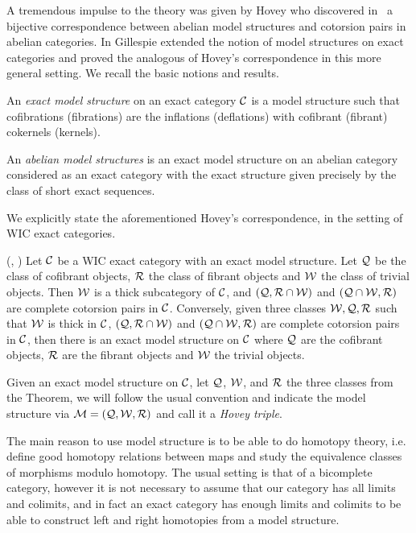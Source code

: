 A tremendous impulse to the theory was given by  Hovey who discovered in~\cite{Hov07} a bijective correspondence between abelian model structures and cotorsion pairs in abelian categories.
%
In \cite{G5} Gillespie extended the notion of model structures on exact categories and proved the analogous of Hovey's correspondence in this more general setting.
 We recall the basic notions and results.
 \begin{defn}\label{D:exact-model} An \emph{exact model structure} on an exact category $\mathcal{C}$ is a model structure such that cofibrations (fibrations) are the inflations (deflations) with cofibrant (fibrant) cokernels (kernels).

   An \emph{abelian model structures} is an exact model structure on an abelian category considered as an exact category with the exact structure given precisely by the class of short exact sequences.
\end{defn}
%

We explicitly state the aforementioned Hovey's correspondence, in the setting of WIC exact categories.

\begin{thm}\label{T:correspondence} (\cite{Hov07}, \cite{G5}) Let $\mathcal{C}$ be a WIC exact category with an exact model structure. Let $\mathcal{Q}$ be the class of cofibrant objects, $\mathcal{R}$ the class of fibrant objects and $\mathcal{W}$ the class of trivial objects. Then $\mathcal{W}$ is a thick subcategory of $\mathcal{C}$, and $(\mathcal{Q}, \mathcal{R}\cap \mathcal{W})$ and $(\mathcal{Q}\cap\mathcal{W}, \mathcal{R})$ are complete cotorsion pairs in $\mathcal{C}$.
Conversely, given three classes $\mathcal{W}, \mathcal{Q}, \mathcal{R}$ such that $\mathcal{W}$ is thick in $\mathcal{C}$, $(\mathcal{Q}, \mathcal{R}\cap \mathcal{W})$ and $(\mathcal{Q}\cap\mathcal{W}, \mathcal{R})$ are complete cotorsion pairs in $\mathcal{C}$, then there is an exact model structure on $\mathcal{C}$ where $\mathcal{Q}$ are the cofibrant objects, $\mathcal{R}$ are the fibrant objects and $\mathcal{W}$ the trivial objects.
\end{thm}

Given an exact model structure on $\mathcal{C}$, let $\mathcal{Q}$, $\mathcal{W}$, and $\mathcal{R}$ the three classes from the Theorem, we will follow the usual convention and indicate the model structure via $\mathcal{M}=(\mathcal{Q},\mathcal{W},\mathcal{R})$ and call it a \emph{Hovey triple}.

The main reason to use model structure is to be able to do homotopy theory, i.e. define good homotopy relations between maps and study the equivalence classes of morphisms modulo homotopy. The usual setting is that of a bicomplete category, however it is not necessary to assume that our category has all limits and colimits, and in fact an exact category has enough limits and colimits to be able to construct left and right homotopies from a model structure.

